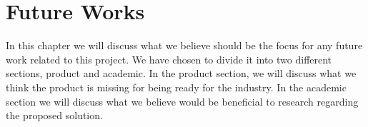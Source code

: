 \chapter{Future Works}
In this chapter we will discuss what we believe should be the focus for any future work related to this project.
We have chosen to divide it into two different sections, product and academic.
In the product section, we will discuss what we think the product is missing for being ready for the industry.
In the academic section we will discuss what we believe would be beneficial to research regarding the proposed solution.



